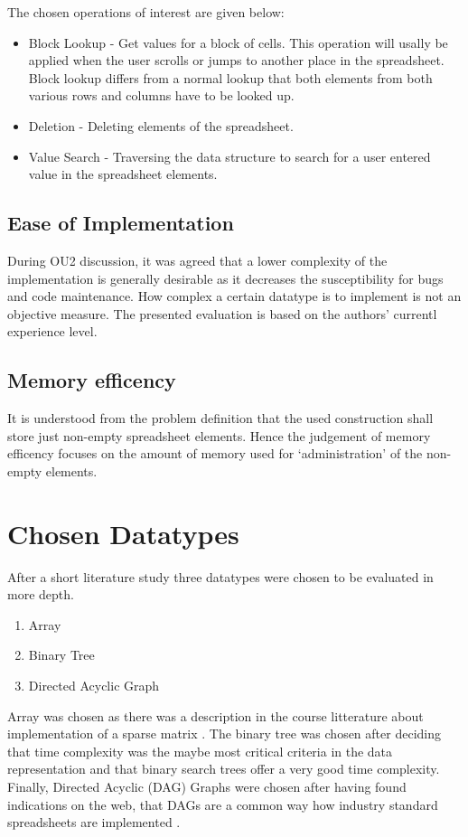 \documentclass[a4paper,11pt,twoside]{article}
\begin{document}
The chosen operations of interest are given below:

\begin{itemize}
\item Block Lookup - Get values for a block of cells. This operation
  will usally be applied when the user scrolls or jumps to another
  place in the spreadsheet. Block lookup differs from a normal lookup
  that both elements from both various rows and columns have to be
  looked up. 
\item Deletion - Deleting elements of the spreadsheet.
\item Value Search - Traversing the data structure to search for a
  user entered value in the spreadsheet elements. 
\end{itemize}

\subsection{Ease of Implementation}
During OU2 discussion, it was agreed that a lower complexity
of the implementation is generally desirable as it decreases the
susceptibility for bugs and code maintenance. How complex a certain
datatype is to implement is not an objective measure. The presented
evaluation is based on the authors' currentl experience level. 


\subsection{Memory efficency}
It is understood from the problem definition that the used
construction shall store just non-empty spreadsheet elements. Hence
the judgement of memory efficency focuses on the amount of
memory used for `administration' of the non-empty elements.

\section{Chosen Datatypes}
After a short literature study three datatypes were chosen to be
evaluated in more depth.

\begin{enumerate}
\item Array
\item Binary Tree
\item Directed Acyclic Graph
\end{enumerate}

Array was chosen as there was a description in the course litterature
about implementation of a sparse matrix \cite{janlert2000}. The binary
tree was chosen after deciding that time complexity was the maybe most
critical criteria in the data representation and that binary search
trees offer a very good time complexity. Finally, Directed Acyclic (DAG)
Graphs were chosen after having found indications on the web, that
DAGs are a common way how industry standard spreadsheets are
implemented \cite{spreadsheet1}\cite{spreadsheet2}\cite{spreadsheet3}.   
\end{document}
